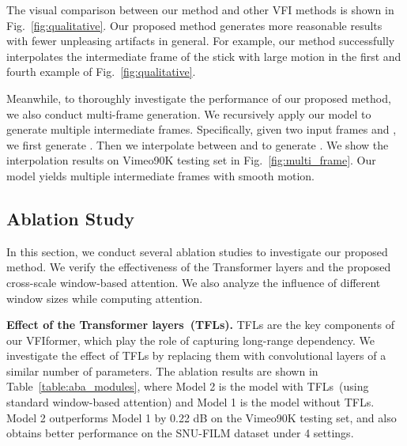 \documentclass[10pt,twocolumn,letterpaper]{article}
\begin{document}
	The visual comparison between our method and other VFI methods is shown in Fig.~\ref{fig:qualitative}. Our proposed method generates more reasonable results with fewer unpleasing artifacts in general. For example, our method successfully interpolates the intermediate frame of the stick with large motion in the first and fourth example of Fig.~\ref{fig:qualitative}.
	
	Meanwhile, to thoroughly investigate the performance of our proposed method, we also conduct multi-frame generation. We recursively apply our model to generate multiple intermediate frames. Specifically, given two input frames  and , we first generate . Then we interpolate between  and  to generate . We show the  interpolation results on Vimeo90K testing set in Fig.~\ref{fig:multi_frame}. Our model yields multiple intermediate frames with smooth motion.
	
	
	
	


	
	
	
	
	\begin{table}
		\setlength{\belowcaptionskip}{0pt}
		\centering
		\caption{Ablation study on the window sizes of self-attention. }
		\label{table:aba_ws}
		\vspace{-0.10in}
	\end{table}
	
	
	
	
	
	\subsection{Ablation Study}
	
	
	In this section, we conduct several ablation studies to investigate our proposed method. We verify the effectiveness of the Transformer layers and the proposed cross-scale window-based attention. We also analyze the influence of different window sizes while computing attention.
	
		\vspace{0.05in}
	\noindent\textbf{Effect of the Transformer layers~(TFLs).} TFLs are the key components of our VFIformer, which play the role of capturing long-range dependency. We investigate the effect of TFLs by replacing them with convolutional layers of a similar number of parameters. The ablation results are shown in Table~\ref{table:aba_modules}, where Model 2 is the model with TFLs~(using standard window-based attention) and Model 1 is the model without TFLs.
	Model 2 outperforms Model 1 by 0.22 dB on the Vimeo90K testing set, and also obtains better performance on the SNU-FILM dataset under 4 settings.
	
\end{document}
